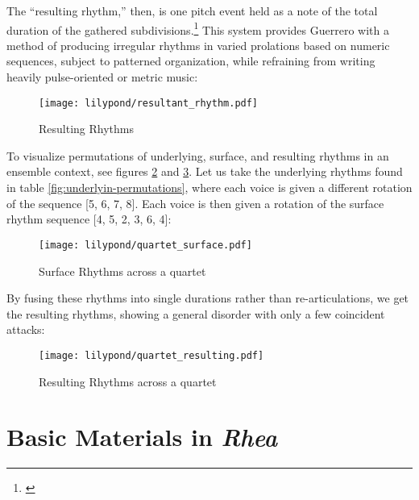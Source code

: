 The ``resulting rhythm,'' then, is one pitch event held as a note of the total duration of the gathered subdivisions.\footnote{\citet[156]{guerreropaper}} This system provides Guerrero with a method of producing irregular rhythms in varied prolations based on numeric sequences, subject to patterned organization, while refraining from writing heavily pulse-oriented or metric music:

\begin{figure}[H]
    \texttt{[image: lilypond/resultant\_rhythm.pdf]}
    \caption{Resulting Rhythms}
    \label{fig:resulting}
\end{figure}

To visualize permutations of underlying, surface, and resulting rhythms in an ensemble context, see figures \ref{fig:surface-quartet} and \ref{fig:resulting-quartet}. Let us take the underlying rhythms found in table \ref{fig:underlyin-permutations}, where each voice is given a different rotation of the sequence [5, 6, 7, 8]. Each voice is then given a rotation of the surface rhythm sequence [4, 5, 2, 3, 6, 4]:

\begin{figure}[H]
    \texttt{[image: lilypond/quartet\_surface.pdf]}
    \caption{Surface Rhythms across a quartet}
    \label{fig:surface-quartet}
\end{figure}

By fusing these rhythms into single durations rather than re-articulations, we get the resulting rhythms, showing a general disorder with only a few coincident attacks:

\begin{figure}[H]
    \texttt{[image: lilypond/quartet\_resulting.pdf]}
    \caption{Resulting Rhythms across a quartet}
    \label{fig:resulting-quartet}
\end{figure}

\section{Basic Materials in \textit{Rhea}}

